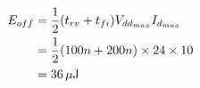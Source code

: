 \subsection{}

\begin{align*}
E_{off} & = \frac{1}{2} (t_{rv} + t_{fi}) V_{dd_{max} } I_{d_{max}} \\
        & = \frac{1}{2} (100n + 200n) \times 24 \times 10 \\
        & = \unit[36]{\mu{}J}
\end{align*}